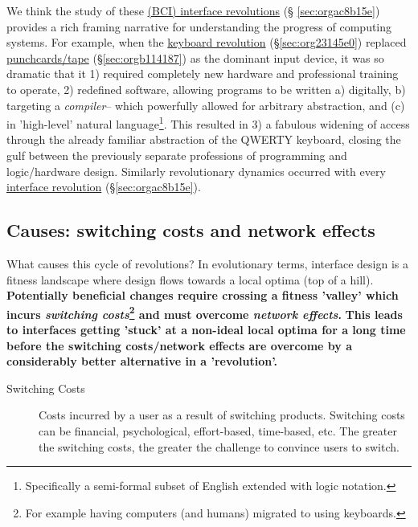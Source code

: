 \documentclass[logo,bsc,singlespacing,parskip]{infthesis}
\begin{document}
We think the study of these \hyperref[sec:orgac8b15e]{(BCI) interface revolutions} (§  \ref{sec:orgac8b15e}) provides a rich framing narrative for understanding the progress of computing systems.
For example, when the \hyperref[sec:org23145e0]{keyboard revolution} (\S \ref{sec:org23145e0}) replaced  \hyperref[sec:orgb114187]{punchcards/tape} (\S \ref{sec:orgb114187}) as the dominant input device, it was so dramatic that it 1) required completely new hardware and professional training to operate, 2) redefined software, allowing programs to be written a) digitally, b) targeting a \emph{compiler}-- which powerfully allowed for arbitrary abstraction, and (c) in 'high-level' natural language\footnote{Specifically a semi-formal subset of English extended with logic notation.}. This resulted in 3) a fabulous widening of access through the already familiar abstraction of the QWERTY keyboard, closing the gulf between the previously separate professions of programming and logic/hardware design.
Similarly revolutionary dynamics occurred with every \hyperref[sec:orgac8b15e]{interface revolution} (\S \ref{sec:orgac8b15e}).
\subsection{Causes: switching costs and network effects}
\label{sec:org21728ce}
What causes this cycle of revolutions?
In evolutionary terms, interface design is a fitness landscape where design flows towards a local optima (top of a hill).
\textbf{Potentially beneficial changes require crossing a fitness 'valley' which incurs \emph{switching costs}\footnote{For example having computers (and humans) migrated to using keyboards.} and must overcome \emph{network effects}.}
\textbf{This leads to interfaces getting 'stuck' at a non-ideal local optima for a long time before the switching costs/network effects are overcome by a considerably better alternative in a 'revolution'.}

\begin{mdframed}
\begin{description}
\item[{Switching Costs\label{switching costs}}] Costs incurred by a user as a result of switching products.
Switching costs can be financial, psychological, effort-based, time-based, etc.
The greater the switching costs, the greater the challenge to convince users to switch.
\end{description}
\end{mdframed}
\end{document}
